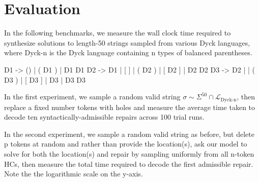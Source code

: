 \documentclass[sigplan,review,anonymous,acmsmall]{acmart}\settopmatter{printfolios=false,printccs=false,printacmref=false}
\begin{document}
    \pagebreak
    \section{Evaluation}

    In the following benchmarks, we measure the wall clock time required to synthesize solutions to length-50 strings sampled from various Dyck languages, where Dyck-n is the Dyck language containing n types of balanced parentheses.

\begin{tidyinput}
D1 -> () | ( D1 ) | D1 D1
D2 -> D1 | [ ] | ( D2 ) | [ D2 ] | D2 D2
D3 -> D2 | { } | ( D3 ) | [ D3 ] | { D3 } | D3 D3
\end{tidyinput}

    \noindent In the first experiment, we sample a random valid string $\sigma \sim \Sigma^{50} \cap \mathcal{L}_{\text{Dyck-n}}$, then replace a fixed number tokens with holes and measure the average time taken to decode ten syntactically-admissible repairs across 100 trial runs.


    \noindent In the second experiment, we sample a random valid string as before, but delete p tokens at random and rather than provide the location(s), ask our model to solve for both the location(s) and repair by sampling uniformly from all n-token HCs, then measure the total time required to decode the first admissible repair. Note the the logarithmic scale on the y-axis.
\end{document}
